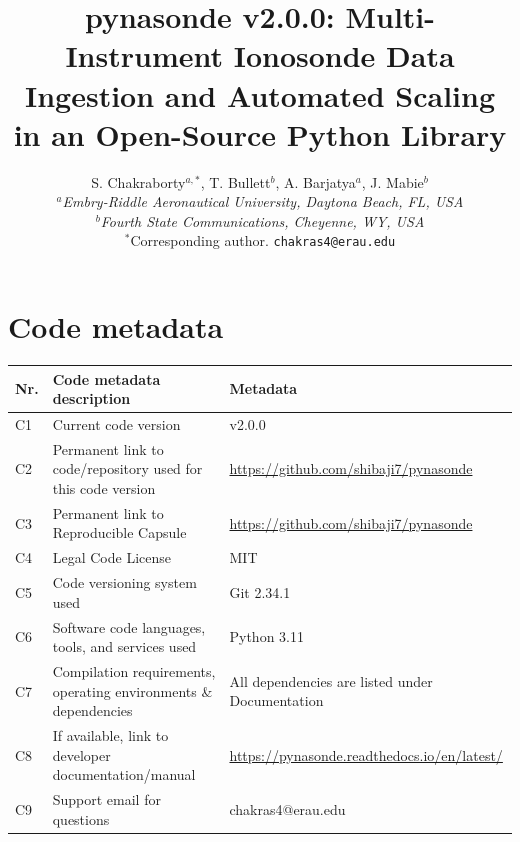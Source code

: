 \documentclass[12pt,a4paper]{article}
\title{\textbf{pynasonde v2.0.0: Multi-Instrument Ionosonde Data Ingestion and
Automated Scaling in an Open-Source Python Library}}
\author{S. Chakraborty$^{a,*}$, T. Bullett$^{b}$, A. Barjatya$^{a}$, J. Mabie$^{b}$\\[4pt]
\small\textit{$^{a}$Embry-Riddle Aeronautical University, Daytona Beach, FL, USA}\\
\small\textit{$^{b}$Fourth State Communications, Cheyenne, WY, USA}\\[4pt]
\small$^{*}$Corresponding author. \texttt{chakras4@erau.edu}}
\date{}
\begin{document}
\linenumbers
\maketitle

\section*{Code metadata}
\begin{table}[h!]
\centering
\begin{tabular}{@{}lp{5.2cm}p{6.8cm}@{}}
\toprule
\textbf{Nr.} & \textbf{Code metadata description} & \textbf{Metadata} \\
\midrule
C1 & Current code version & v2.0.0 \\
C2 & Permanent link to code/repository used for this code version & \url{https://github.com/shibaji7/pynasonde} \\
C3 & Permanent link to Reproducible Capsule & \url{https://github.com/shibaji7/pynasonde} \\
C4 & Legal Code License & MIT \\
C5 & Code versioning system used & Git 2.34.1 \\
C6 & Software code languages, tools, and services used & Python 3.11 \\
C7 & Compilation requirements, operating environments \& dependencies & All dependencies are listed under Documentation \\
C8 & If available, link to developer documentation/manual & \url{https://pynasonde.readthedocs.io/en/latest/} \\
C9 & Support email for questions & chakras4@erau.edu \\
\bottomrule
\end{tabular}
\end{table}
\end{document}
